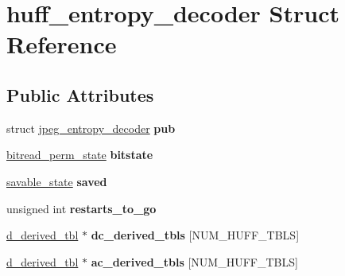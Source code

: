 \hypertarget{structhuff__entropy__decoder}{}\section{huff\+\_\+entropy\+\_\+decoder Struct Reference}
\label{structhuff__entropy__decoder}
\subsection*{Public Attributes}
\begin{DoxyCompactItemize}
\item 
struct \hyperlink{structjpeg__entropy__decoder}{jpeg\+\_\+entropy\+\_\+decoder} {\bfseries pub}\hypertarget{structhuff__entropy__decoder_a85f304c89441e96be66e49685cf24c3d}{}\label{structhuff__entropy__decoder_a85f304c89441e96be66e49685cf24c3d}

\item 
\hyperlink{structbitread__perm__state}{bitread\+\_\+perm\+\_\+state} {\bfseries bitstate}\hypertarget{structhuff__entropy__decoder_a06e5f8944ccb6057c6f72b3df2441223}{}\label{structhuff__entropy__decoder_a06e5f8944ccb6057c6f72b3df2441223}

\item 
\hyperlink{structsavable__state}{savable\+\_\+state} {\bfseries saved}\hypertarget{structhuff__entropy__decoder_a0e0efb55a8a5b01e1e49aa9c3fb8dfe6}{}\label{structhuff__entropy__decoder_a0e0efb55a8a5b01e1e49aa9c3fb8dfe6}

\item 
unsigned int {\bfseries restarts\+\_\+to\+\_\+go}\hypertarget{structhuff__entropy__decoder_af6005b639dada949c62767bed24daa1a}{}\label{structhuff__entropy__decoder_af6005b639dada949c62767bed24daa1a}

\item 
\hyperlink{structd__derived__tbl}{d\+\_\+derived\+\_\+tbl} $\ast$ {\bfseries dc\+\_\+derived\+\_\+tbls} \mbox{[}N\+U\+M\+\_\+\+H\+U\+F\+F\+\_\+\+T\+B\+LS\mbox{]}\hypertarget{structhuff__entropy__decoder_a277328a6f93b55616bd86b0056098c65}{}\label{structhuff__entropy__decoder_a277328a6f93b55616bd86b0056098c65}

\item 
\hyperlink{structd__derived__tbl}{d\+\_\+derived\+\_\+tbl} $\ast$ {\bfseries ac\+\_\+derived\+\_\+tbls} \mbox{[}N\+U\+M\+\_\+\+H\+U\+F\+F\+\_\+\+T\+B\+LS\mbox{]}\hypertarget{structhuff__entropy__decoder_a19edd8c7e80bfe34c21e6fe35ef90cce}{}\label{structhuff__entropy__decoder_a19edd8c7e80bfe34c21e6fe35ef90cce}


\end{DoxyCompactItemize}
